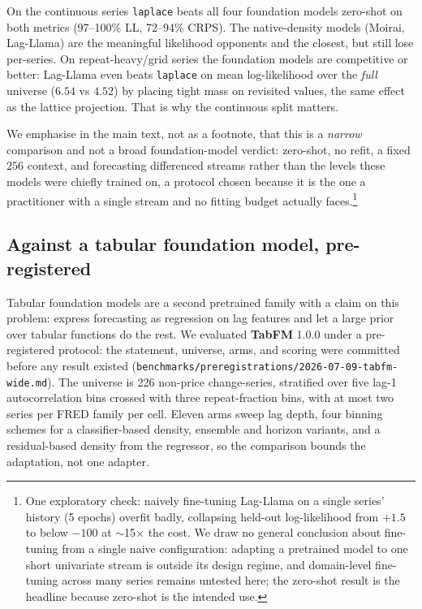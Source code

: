 \documentclass[article]{jss}
\providecommand{\pkg}[1]{\textbf{#1}}
\providecommand{\code}[1]{\texttt{#1}}
\begin{document}
On the continuous series \code{laplace} beats all four foundation models
zero-shot on both metrics (97--100\% LL, 72--94\% CRPS). The native-density
models (Moirai, Lag-Llama) are the meaningful likelihood opponents and the
closest, but still lose per-series. On repeat-heavy/grid series the foundation
models are competitive or better: Lag-Llama even beats \code{laplace} on mean
log-likelihood over the \emph{full} universe ($6.54$ vs $4.52$) by placing tight
mass on revisited values, the same effect as the lattice projection. That is
why the continuous split matters.

We emphasise in the main text, not as a
footnote, that this is a \emph{narrow} comparison and not a broad
foundation-model verdict: zero-shot, no refit, a fixed $256$ context, and
forecasting differenced streams rather than the levels these models were
chiefly trained on, a protocol chosen because it is the one a practitioner
with a single stream and no fitting budget actually faces.\footnote{One
exploratory check: naively fine-tuning Lag-Llama on a single series' history
(5 epochs) overfit badly, collapsing held-out log-likelihood from $+1.5$ to
below $-100$ at $\sim$15$\times$ the cost. We draw no general conclusion about
fine-tuning from a single naive configuration: adapting a pretrained model to
one short univariate stream is outside its design regime, and domain-level
fine-tuning across many series remains untested here; the zero-shot result is
the headline because zero-shot is the intended use.}

\subsection{Against a tabular foundation model, pre-registered}
\label{sec:tabfm}

Tabular foundation models are a second pretrained family with a claim on
this problem: express forecasting as regression on lag features and let a
large prior over tabular functions do the rest. We evaluated \pkg{TabFM}
1.0.0 \citep{tabfm2026} under a pre-registered protocol: the statement,
universe, arms, and scoring were committed before any result existed
(\code{benchmarks/preregistrations/2026-07-09-tabfm-wide.md}). The
universe is 226 non-price change-series, stratified over five lag-1
autocorrelation bins crossed with three repeat-fraction bins, with at most
two series per FRED family per cell. Eleven arms sweep lag depth, four
binning schemes for a classifier-based density, ensemble and horizon
variants, and a residual-based density from the regressor, so the
comparison bounds the adaptation, not one adapter.
\end{document}
